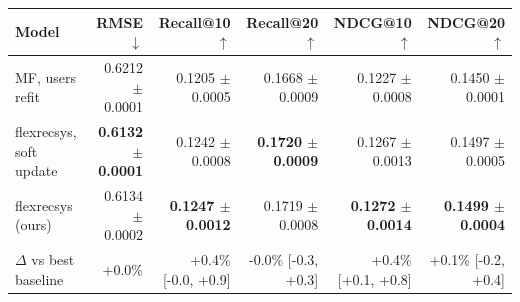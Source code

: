 \begin{tabular}{lrrrrr}
\toprule
Model & RMSE $\downarrow$ & Recall@10 $\uparrow$ & Recall@20 $\uparrow$ & NDCG@10 $\uparrow$ & NDCG@20 $\uparrow$ \\
\midrule
MF, users refit & 0.6212 $\pm$ 0.0001 & 0.1205 $\pm$ 0.0005 & 0.1668 $\pm$ 0.0009 & 0.1227 $\pm$ 0.0008 & 0.1450 $\pm$ 0.0001 \\
flexrecsys, soft update & \textbf{0.6132 $\pm$ 0.0001} & 0.1242 $\pm$ 0.0008 & \textbf{0.1720 $\pm$ 0.0009} & 0.1267 $\pm$ 0.0013 & 0.1497 $\pm$ 0.0005 \\
flexrecsys (ours) & 0.6134 $\pm$ 0.0002 & \textbf{0.1247 $\pm$ 0.0012} & 0.1719 $\pm$ 0.0008 & \textbf{0.1272 $\pm$ 0.0014} & \textbf{0.1499 $\pm$ 0.0004} \\
\midrule
$\Delta$ vs best baseline & +0.0\% & +0.4\% [-0.0, +0.9] & -0.0\% [-0.3, +0.3] & +0.4\% [+0.1, +0.8] & +0.1\% [-0.2, +0.4] \\
\bottomrule
\end{tabular}
